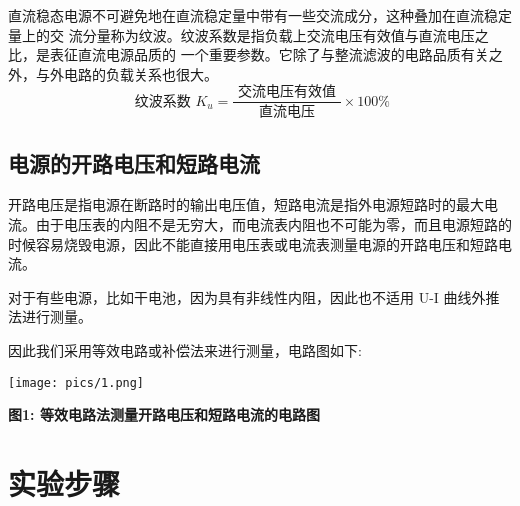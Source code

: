 \documentclass[10pt,a4paper]{article}
\makeatletter
\newenvironment{figurehere}
{\def\@captype{figure}}
{}
\makeatother
\begin{document}
	直流稳态电源不可避免地在直流稳定量中带有一些交流成分，这种叠加在直流稳定量上的交
	流分量称为纹波。纹波系数是指负载上交流电压有效值与直流电压之比，是表征直流电源品质的
	一个重要参数。它除了与整流滤波的电路品质有关之外，与外电路的负载关系也很大。
	$$
		\text { 纹波系数 } K_u=\frac{\text { 交流电压有效值 }}{\text { 直流电压 }} \times 100 \%
	$$
	

	\subsection{电源的开路电压和短路电流}

	开路电压是指电源在断路时的输出电压值，短路电流是指外电源短路时的最大电流。由于电压表的内阻不是无穷大，而电流表内阻也不可能为零，而且电源短路的时候容易烧毁电源，因此不能直接用电压表或电流表测量电源的开路电压和短路电流。
 	
	对于有些电源，比如干电池，因为具有非线性内阻，因此也不适用 U-I 曲线外推法进行测量。
	
	因此我们采用等效电路或补偿法来进行测量，电路图如下:

	\begin{figurehere}
		\centering
		\texttt{[image: pics/1.png]}
		\caption*{\bf 图1: 等效电路法测量开路电压和短路电流的电路图}
	\end{figurehere}

	\newpage
	\section{实验步骤}
	
\end{document}

